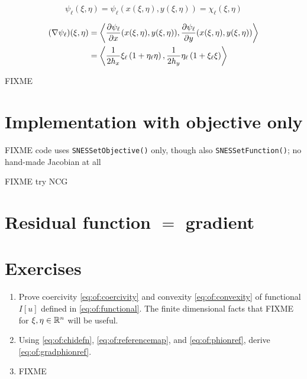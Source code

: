 \begin{equation}
  \psi_\ell(\xi,\eta) = \psi_\ell(x(\xi,\eta),y(\xi,\eta)) = \chi_\ell(\xi,\eta)  \label{eq:of:phionref}
\end{equation}

\begin{align}
  (\nabla \psi_\ell)(\xi,\eta) &= \left<\frac{\partial\psi_\ell}{\partial x}(x(\xi,\eta),y(\xi,\eta)),\frac{\partial\psi_\ell}{\partial y}(x(\xi,\eta),y(\xi,\eta))\right> \label{eq:of:gradphionref} \\
     &= \left<\frac{1}{2h_x}\xi_\ell \left(1+\eta_\ell \eta\right),\frac{1}{2h_y}\eta_\ell \left(1+\xi_\ell \xi\right)\right> \notag
\end{align}

\begin{marginfigure}

\caption{FIXME}
\label{fig:q1hat}
\end{marginfigure}


\section{Implementation with objective only}

FIXME code uses \texttt{SNESSetObjective()} only, though also \texttt{SNESSetFunction()}; no hand-made Jacobian at all

FIXME try NCG






\section{Residual function $=$ gradient}



\section{Exercises}

\renewcommand{\labelenumi}{\arabic{chapter}.\arabic{enumi}\quad}
\renewcommand{\labelenumii}{(\alph{enumii})}
\begin{enumerate}
\item Prove coercivity \eqref{eq:of:coercivity} and convexity \eqref{eq:of:convexity} of functional $I[u]$ defined in \eqref{eq:of:functional}.  The finite dimensional facts that FIXME for $\xi,\eta\in\mathbb{R}^n$ will be useful.

\item Using \eqref{eq:of:chidefn}, \eqref{eq:of:referencemap}, and \eqref{eq:of:phionref}, derive \eqref{eq:of:gradphionref}.

\item FIXME
\end{enumerate}
